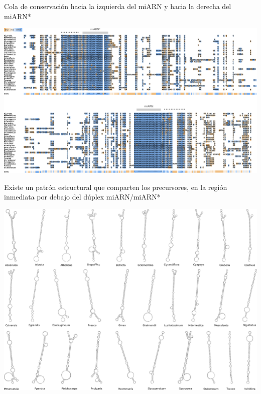 \documentclass{beamer}
\begin{document}
\begin{frame}{Cola de conservación hacia la izquierda del miARN y hacia la derecha del miARN*}
	\begin{center}
		\includegraphics[width=1\textwidth]{img/miR172a_tcoffee_03.png}
	\end{center}
\end{frame}

\begin{frame}{Existe un patrón estructural que comparten los precursores, en la región inmediata por debajo del dúplex miARN/miARN*}
	\begin{center}
		\includegraphics[width=.8\textwidth]{img/miR172a_rnafold.png}
	\end{center}
    \begin{center}
    \end{center}
\end{frame}
\end{document}

